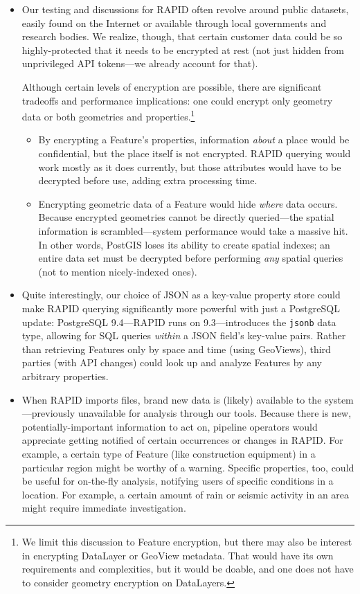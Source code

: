 \begin{itemize}
    \item Our testing and discussions for RAPID often revolve around public datasets, easily found on the Internet or available through local governments and research bodies. We realize, though, that certain customer data could be so highly-protected that it needs to be encrypted at rest (not just hidden from unprivileged API tokens---we already account for that).
    
    Although certain levels of encryption are possible, there are significant tradeoffs and performance implications: one could encrypt only geometry data or both geometries and properties.\footnote{We limit this discussion to Feature encryption, but there may also be interest in encrypting DataLayer or GeoView metadata. That would have its own requirements and complexities, but it would be doable, and one does not have to consider geometry encryption on DataLayers.}
    \begin{itemize}
        \item By encrypting a Feature's properties, information \textit{about} a place would be confidential, but the place itself is not encrypted. RAPID querying would work mostly as it does currently, but those attributes would have to be decrypted before use, adding extra processing time.
        \item Encrypting geometric data of a Feature would hide \textit{where} data occurs. Because encrypted geometries cannot be directly queried---the spatial information is scrambled---system performance would take a massive hit. In other words, PostGIS loses its ability to create spatial indexes; an entire data set must be decrypted before performing \textit{any} spatial queries (not to mention nicely-indexed ones).
    \end{itemize}
    
    \item Quite interestingly, our choice of JSON as a key-value property store could make RAPID querying significantly more powerful with just a PostgreSQL update: PostgreSQL 9.4---RAPID runs on 9.3---introduces the \texttt{jsonb} data type, allowing for SQL queries \textit{within} a JSON field's key-value pairs. Rather than retrieving Features only by space and time (using GeoViews), third parties (with API changes) could look up and analyze Features by any arbitrary properties.
    
    \item When RAPID imports files, brand new data is (likely) available to the system---previously unavailable for analysis through our tools. Because there is new, potentially-important information to act on, pipeline operators would appreciate getting notified of certain occurrences or changes in RAPID. For example, a certain type of Feature (like construction equipment) in a particular region might be worthy of a warning. Specific properties, too, could be useful for on-the-fly analysis, notifying users of specific conditions in a location. For example, a certain amount of rain or seismic activity in an area might require immediate investigation.
    

\end{itemize}
